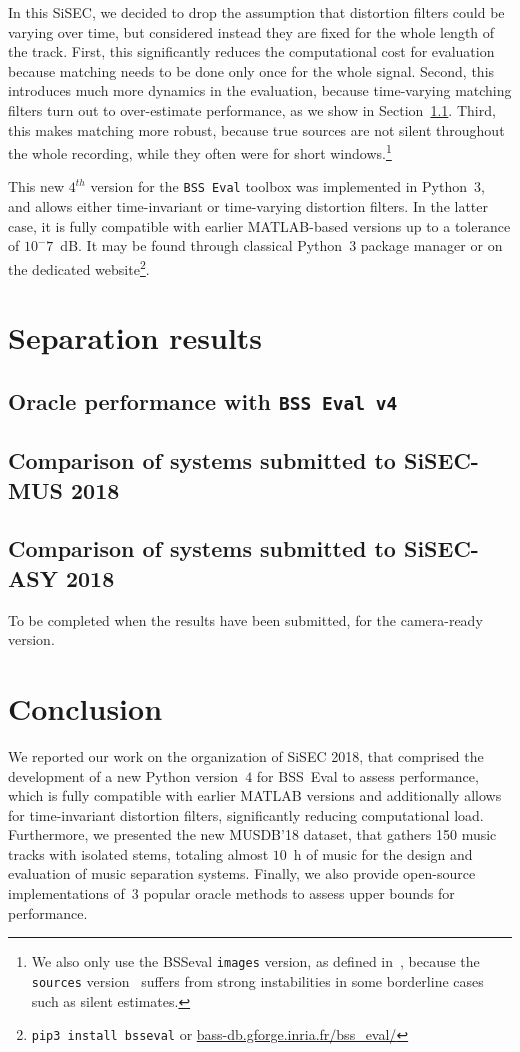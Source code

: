\documentclass{llncs}
\begin{document}
In this SiSEC, we decided to drop the assumption that distortion filters could be varying over time, but considered instead they are fixed for the whole length of the track. First, this significantly reduces the computational cost for evaluation because matching needs to be done only once for the whole signal. Second, this introduces much more dynamics in the evaluation, because time-varying matching filters turn out to over-estimate performance, as we show in Section~\ref{ssec:bsseval-results}. Third, this makes matching more robust, because true sources are not silent throughout the whole recording, while they often were for short windows.\footnote{We also only use the BSSeval \texttt{images} version, as defined in~\cite{bssevalv3}, because the \texttt{sources} version~\cite{bssevalv2} suffers from strong instabilities in some borderline cases such as silent estimates.}

This new $4^{th}$ version for the \texttt{BSS~Eval} toolbox was implemented in Python~3, and allows either time-invariant or time-varying distortion filters. In the latter case, it is fully compatible with earlier MATLAB-based versions up to a tolerance of $10^-7$~dB. It may be found through classical Python~3 package manager or on the dedicated website\footnote{\texttt{pip3 install bsseval} or \url{bass-db.gforge.inria.fr/bss_eval/}}.

\section{Separation results}
\subsection{Oracle performance with \texttt{BSS Eval v4}}
\label{ssec:bsseval-results}
\subsection{Comparison of systems submitted to SiSEC-MUS 2018}
\subsection{Comparison of systems submitted to SiSEC-ASY 2018}
To be completed when the results have been submitted, for the camera-ready version.

\section{Conclusion}
\label{sec:concl}
\vspace{-2mm}
We reported our work on the organization of SiSEC 2018, that comprised the development of a new Python version~$4$ for BSS~Eval to assess performance, which is fully compatible with earlier MATLAB versions and additionally allows for time-invariant distortion filters, significantly reducing computational load. Furthermore, we presented the new MUSDB'18 dataset, that gathers 150 music tracks with isolated stems, totaling almost $10$~h of music for the design and evaluation of music separation systems. Finally, we also provide open-source implementations of~$3$ popular oracle methods to assess upper bounds for performance.
\end{document}
